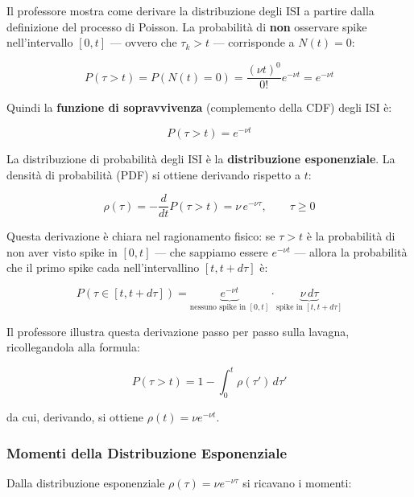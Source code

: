 Il professore mostra come derivare la distribuzione degli ISI a partire dalla definizione del processo di Poisson. La probabilità di \textbf{non} osservare spike nell'intervallo $[0, t]$ — ovvero che $\tau_k > t$ — corrisponde a $N(t) = 0$:

\begin{equation}
P(\tau > t) = P(N(t) = 0) = \frac{(\nu t)^0}{0!} e^{-\nu t} = e^{-\nu t}
\end{equation}

Quindi la \textbf{funzione di sopravvivenza} (complemento della CDF) degli ISI è:

\begin{equation}
P(\tau > t) = e^{-\nu t}
\end{equation}

La distribuzione di probabilità degli ISI è la \textbf{distribuzione esponenziale}. La densità di probabilità (PDF) si ottiene derivando rispetto a $t$:

\begin{equation}
\rho(\tau) = -\frac{d}{dt} P(\tau > t) = \nu \, e^{-\nu \tau}, \qquad \tau \geq 0
\end{equation}

Questa derivazione è chiara nel ragionamento fisico: se $\tau > t$ è la probabilità di non aver visto spike in $[0,t]$ — che sappiamo essere $e^{-\nu t}$ — allora la probabilità che il primo spike cada nell'intervallino $[t, t+d\tau]$ è:

\begin{equation}
P(\tau \in [t, t+d\tau]) = \underbrace{e^{-\nu t}}_{\text{nessuno spike in }[0,t]} \cdot \underbrace{\nu \, d\tau}_{\text{spike in }[t, t+d\tau]}
\end{equation}

Il professore illustra questa derivazione passo per passo sulla lavagna, ricollegandola alla formula:

\begin{equation}
P(\tau > t) = 1 - \int_0^t \rho(\tau') \, d\tau'
\end{equation}

da cui, derivando, si ottiene $\rho(t) = \nu e^{-\nu t}$.

\subsubsection{Momenti della Distribuzione Esponenziale}

Dalla distribuzione esponenziale $\rho(\tau) = \nu e^{-\nu \tau}$ si ricavano i momenti:

